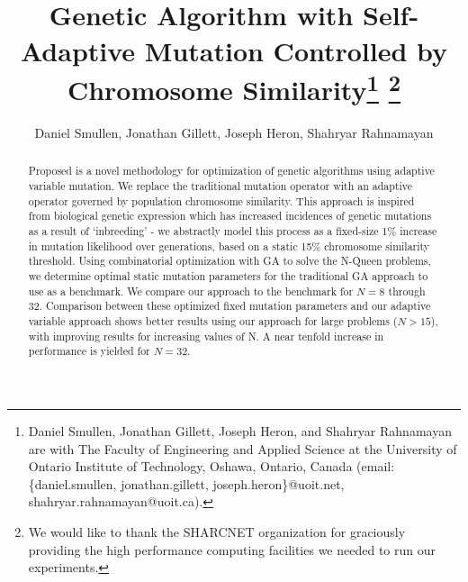 \documentclass[conference]{IEEEtran}
\begin{document}
\title{\ \\ \LARGE\bf Genetic Algorithm with Self-Adaptive Mutation Controlled by Chromosome Similarity\thanks{Daniel Smullen, Jonathan Gillett, Joseph Heron, and Shahryar Rahnamayan are with The Faculty of Engineering and Applied Science at the University of Ontario Institute of Technology, Oshawa, Ontario, Canada (email: \{daniel.smullen, jonathan.gillett, joseph.heron\}@uoit.net, shahryar.rahnamayan@uoit.ca).} \thanks{We would like to thank the SHARCNET organization for graciously providing the high performance computing facilities we needed to run our experiments.}}

\author{Daniel Smullen, Jonathan Gillett, Joseph Heron, Shahryar Rahnamayan}


\maketitle

\begin{abstract}
Proposed is a novel methodology for optimization of genetic algorithms using adaptive variable mutation. We replace the traditional mutation operator with an adaptive operator governed by population chromosome similarity. This approach is inspired from biological genetic expression which has increased incidences of genetic mutations as a result of `inbreeding' - we abstractly model this process as a fixed-size 1\% increase in mutation likelihood over generations, based on a static 15\% chromosome similarity threshold. Using combinatorial optimization with GA to solve the N-Queen problems, we determine optimal static mutation parameters for the traditional GA approach to use as a benchmark. We compare our approach to the benchmark for $N = 8$ through 32. Comparison between these optimized fixed mutation parameters and our adaptive variable approach shows better results using our approach for large problems ($N > 15$), with improving results for increasing values of N. A near tenfold increase in performance is yielded for $N = 32$.
\end{abstract}

\end{document}
